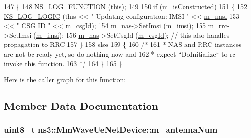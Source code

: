 \begin{DoxyCode}
147 \{
148   \hyperlink{log-macros-disabled_8h_a90b90d5bad1f39cb1b64923ea94c0761}{NS\_LOG\_FUNCTION} (\textcolor{keyword}{this});
149 
150   \textcolor{keywordflow}{if} (\hyperlink{classns3_1_1MmWaveUeNetDevice_a1f179adb1f72bfa7217facaff41070fe}{m\_isConstructed})
151     \{
152       \hyperlink{group__logging_ga88acd260151caf2db9c0fc84997f45ce}{NS\_LOG\_LOGIC} (\textcolor{keyword}{this} << \textcolor{stringliteral}{" Updating configuration: IMSI "} << 
      \hyperlink{classns3_1_1MmWaveUeNetDevice_accb498f57e59995ffc28d6c43972b704}{m\_imsi}
153                          << \textcolor{stringliteral}{" CSG ID "} << \hyperlink{classns3_1_1MmWaveUeNetDevice_a1d4f36f4bc6f877b8353af1ef8209be7}{m\_csgId});
154       \hyperlink{classns3_1_1MmWaveUeNetDevice_a319384837270ac64549ce162cdc58c68}{m\_nas}->SetImsi (\hyperlink{classns3_1_1MmWaveUeNetDevice_accb498f57e59995ffc28d6c43972b704}{m\_imsi});
155       \hyperlink{classns3_1_1MmWaveUeNetDevice_aa4abc428c965374f4106eb1e3f385bef}{m\_rrc}->SetImsi (\hyperlink{classns3_1_1MmWaveUeNetDevice_accb498f57e59995ffc28d6c43972b704}{m\_imsi});
156       \hyperlink{classns3_1_1MmWaveUeNetDevice_a319384837270ac64549ce162cdc58c68}{m\_nas}->SetCsgId (\hyperlink{classns3_1_1MmWaveUeNetDevice_a1d4f36f4bc6f877b8353af1ef8209be7}{m\_csgId}); \textcolor{comment}{// this also handles propagation to RRC}
157     \}
158   \textcolor{keywordflow}{else}
159     \{
160       \textcolor{comment}{/*}
161 \textcolor{comment}{       * NAS and RRC instances are not be ready yet, so do nothing now and}
162 \textcolor{comment}{       * expect ``DoInitialize`` to re-invoke this function.}
163 \textcolor{comment}{       */}
164     \}
165 \}
\end{DoxyCode}


Here is the caller graph for this function\+:




\subsection{Member Data Documentation}
\subsubsection[{\texorpdfstring{m\+\_\+antenna\+Num}{m_antennaNum}}]{\setlength{\rightskip}{0pt plus 5cm}uint8\+\_\+t ns3\+::\+Mm\+Wave\+Ue\+Net\+Device\+::m\+\_\+antenna\+Num\hspace{0.3cm}{\ttfamily [private]}}\hypertarget{classns3_1_1MmWaveUeNetDevice_afd15523e3af5d08f8cf91f816b35e248}{}\label{classns3_1_1MmWaveUeNetDevice_afd15523e3af5d08f8cf91f816b35e248}
